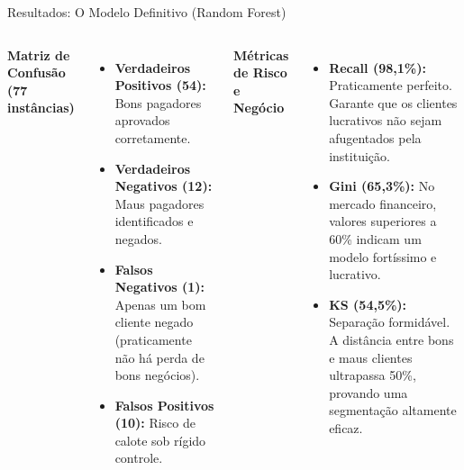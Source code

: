 \documentclass[aspectratio=169]{beamer}
\begin{document}
\begin{frame}{Resultados: O Modelo Definitivo (Random Forest)}
    \begin{columns}
        \textbf{Matriz de Confusão (77 instâncias)}
        \begin{itemize}
            \item \textbf{Verdadeiros Positivos (54):} Bons pagadores aprovados corretamente.
            \item \textbf{Verdadeiros Negativos (12):} Maus pagadores identificados e negados.
            \item \textbf{Falsos Negativos (1):} Apenas um bom cliente negado (praticamente não há perda de bons negócios).
            \item \textbf{Falsos Positivos (10):} Risco de calote sob rígido controle.
        \end{itemize}
        
        \textbf{Métricas de Risco e Negócio}
        \begin{itemize}
            \item \textbf{Recall (98,1\%):} Praticamente perfeito. Garante que os clientes lucrativos não sejam afugentados pela instituição.
            \item \textbf{Gini (65,3\%):} No mercado financeiro, valores superiores a 60\% indicam um modelo fortíssimo e lucrativo.
            \item \textbf{KS (54,5\%):} Separação formidável. A distância entre bons e maus clientes ultrapassa 50\%, provando uma segmentação altamente eficaz.
        \end{itemize}
    \end{columns}
\end{frame}
\end{document}

